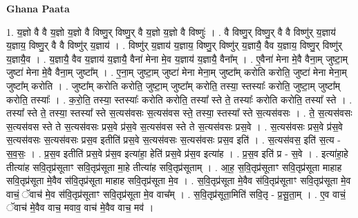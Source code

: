 \documentclass[17pt]{extarticle}
\begin{document}
\textbf{Ghana Paata } \newline

1. य॒ज्ञो वै वै य॒ज्ञो य॒ज्ञो वै विष्णु॒र् विष्णु॒र् वै य॒ज्ञो य॒ज्ञो वै विष्णुः॑ । . वै विष्णु॒र् विष्णु॒र् वै वै विष्णु॑र् य॒ज्ञाय॑ य॒ज्ञाय॒ विष्णु॒र् वै वै विष्णु॑र् य॒ज्ञाय॑ । . विष्णु॑र् य॒ज्ञाय॑ य॒ज्ञाय॒ विष्णु॒र् विष्णु॑र् य॒ज्ञायै॒ वैव य॒ज्ञाय॒ विष्णु॒र् विष्णु॑र् य॒ज्ञायै॒व । . य॒ज्ञायै॒ वैव य॒ज्ञाय॑ य॒ज्ञायै॒ वैना॑ मेना मे॒व य॒ज्ञाय॑ य॒ज्ञायै॒ वैना᳚म् । . ए॒वैना॑ मेना मे॒वै वैना॒म् जुष्टा॒म् जुष्टा॑ मेना मे॒वै वैना॒म् जुष्टा᳚म् । . ए॒ना॒म् जुष्टा॒म् जुष्टा॑ मेना मेना॒म् जुष्टा᳚म् करोति करोति॒ जुष्टा॑ मेना मेना॒म् जुष्टा᳚म् करोति । . जुष्टा᳚म् करोति करोति॒ जुष्टा॒म् जुष्टा᳚म् करोति॒ तस्या॒ स्तस्याः᳚ करोति॒ जुष्टा॒म् जुष्टा᳚म् करोति॒ तस्याः᳚ । . क॒रो॒ति॒ तस्या॒ स्तस्याः᳚ करोति करोति॒ तस्या᳚ स्ते ते॒ तस्याः᳚ करोति करोति॒ तस्या᳚ स्ते । . तस्या᳚ स्ते ते॒ तस्या॒ स्तस्या᳚ स्ते स॒त्यस॑वसः स॒त्यस॑वस स्ते॒ तस्या॒ स्तस्या᳚ स्ते स॒त्यस॑वसः । . ते॒ स॒त्यस॑वसः स॒त्यस॑वस स्ते ते स॒त्यस॑वसः प्रस॒वे प्र॑स॒वे स॒त्यस॑वस स्ते ते स॒त्यस॑वसः प्रस॒वे । . स॒त्यस॑वसः प्रस॒वे प्र॑स॒वे स॒त्यस॑वसः स॒त्यस॑वसः प्रस॒व इतीति॑ प्रस॒वे स॒त्यस॑वसः स॒त्यस॑वसः प्रस॒व इति॑ । . स॒त्यस॑वस॒ इति॑ स॒त्य - स॒व॒सः॒ । . प्र॒स॒व इतीति॑ प्रस॒वे प्र॑स॒व इत्या॑हा॒ हेति॑ प्रस॒वे प्र॑स॒व इत्या॑ह । . प्र॒स॒व इति॑ प्र - स॒वे । . इत्या॑हा॒हे तीत्या॑ह सवि॒तृप्र॑सूताꣳ सवि॒तृप्र॑सूता मा॒हे तीत्या॑ह सवि॒तृप्र॑सूताम् । . आ॒ह॒ स॒वि॒तृप्र॑सूताꣳ सवि॒तृप्र॑सूता माहाह सवि॒तृप्र॑सूता मे॒वैव स॑वि॒तृप्र॑सूता माहाह सवि॒तृप्र॑सूता मे॒व । . स॒वि॒तृप्र॑सूता मे॒वैव स॑वि॒तृप्र॑सूताꣳ सवि॒तृप्र॑सूता मे॒व वाचं॒ ॅवाच॑ मे॒व स॑वि॒तृप्र॑सूताꣳ सवि॒तृप्र॑सूता मे॒व वाच᳚म् । . स॒वि॒तृप्र॑सूता॒मिति॑ सवि॒तृ - प्र॒सू॒ता॒म् । . ए॒व वाचं॒ ॅवाच॑ मे॒वैव वाच॒ मवाव॒ वाच॑ मे॒वैव वाच॒ मव॑ । \newline
\end{document}
